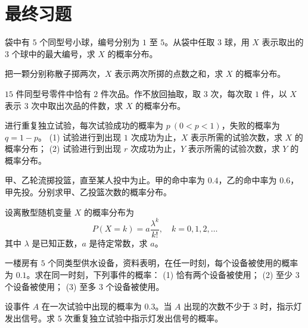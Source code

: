 \section{最终习题}
\begin{homework}[2.1]
袋中有 $5$ 个同型号小球，编号分别为 $1$ 至 $5$。从袋中任取 $3$ 球，用 $X$ 表示取出的 $3$ 个球中的最大编号，求 $X$ 的概率分布。
\end{homework}

\begin{homework}[2.2]
把一颗分别称散子掷两次，$X$ 表示两次所掷的点数之和，求 $X$ 的概率分布。
\end{homework}

\begin{homework}[2.3]
$15$ 件同型号零件中恰有 $2$ 件次品。作不放回抽取，取 $3$ 次，每次取 $1$ 件，以 $X$ 表示 $3$ 次中取出次品的件数，求 $X$ 的概率分布。
\end{homework}

\begin{homework}[2.4]
进行重复独立试验，每次试验成功的概率为 $p \ (0 < p < 1)$，失败的概率为 $q = 1 - p$。  
(1) 试验进行到出现 $1$ 次成功为止，$X$ 表示所需的试验次数，求 $X$ 的概率分布；  
(2) 试验进行到出现 $r$ 次成功为止，$Y$ 表示所需的试验次数，求 $Y$ 的概率分布。
\end{homework}

\begin{homework}[2.5]
甲、乙轮流掷投篮，直至某人投中为止。甲的命中率为 $0.4$，乙的命中率为 $0.6$，甲先投。分别求甲、乙投篮次数的概率分布。
\end{homework}

\begin{homework}[2.6]
设离散型随机变量 $X$ 的概率分布为
\[
P(X = k) = a \frac{\lambda^k}{k!}, \quad k = 0,1,2,\ldots
\]
其中 $\lambda$ 是已知正数，$a$ 是待定常数，求 $a$。
\end{homework}

\begin{homework}[2.7]
一楼房有 $5$ 个同类型供水设备，资料表明，在任一时刻，每个设备被使用的概率为 $0.1$。求在同一时刻，下列事件的概率：  
(1) 恰有两个设备被使用；  
(2) 至少 $3$ 个设备被使用；  
(3) 至多 $3$ 个设备被使用。
\end{homework}

\begin{homework}[2.8]
设事件 $A$ 在一次试验中出现的概率为 $0.3$。当 $A$ 出现的次数不少于 $3$ 时，指示灯发出信号。求 $5$ 次重复独立试验中指示灯发出信号的概率。
\end{homework}

